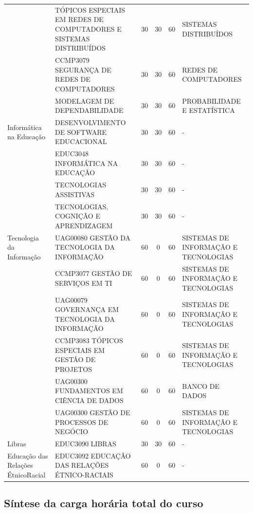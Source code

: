 \documentclass[
	12pt,				%
	openright,			%
  oneside,     %
	a4paper,			%
	chapter=TITLE,		%
	english,			%
	french,				%
	spanish,			%
	brazil				%
	]{abntex2}
\begin{document}
\begin{center}
\begin{tiny}
\begin{longtable}{p{2.5cm}p{5.5cm}cccp{3.3cm}}
      & TÓPICOS ESPECIAIS EM REDES DE COMPUTADORES E SISTEMAS DISTRIBUÍDOS & 30 & 30 & 60 & SISTEMAS DISTRIBUÍDOS \\ \cline{2-6}
      & CCMP3079 SEGURANÇA DE REDES DE COMPUTADORES & 30 & 30 & 60 & REDES DE COMPUTADORES \\ \cline{2-6}
      & MODELAGEM DE DEPENDABILIDADE  & 30 & 30 & 60 & PROBABILIDADE E ESTATÍSTICA \\ \midrule
    Informática na Educação & DESENVOLVIMENTO DE SOFTWARE EDUCACIONAL & 30 & 30 & 60 & - \\ \cline{2-6}
      & EDUC3048 INFORMÁTICA NA EDUCAÇÃO & 30 & 30 & 60 & - \\ \cline{2-6}
      & TECNOLOGIAS ASSISTIVAS & 30 & 30 & 60 & - \\ \cline{2-6}
      & TECNOLOGIAS, COGNIÇÃO E APRENDIZAGEM & 30 & 30 & 60 & - \\ \midrule
    Tecnologia da Informação & UAG00080 GESTÃO DA TECNOLOGIA DA INFORMAÇÃO & 60 & 0 & 60 & SISTEMAS DE INFORMAÇÃO E TECNOLOGIAS \\ \cline{2-6}
      & CCMP3077 GESTÃO DE SERVIÇOS EM TI & 60 & 0 & 60 & SISTEMAS DE INFORMAÇÃO E TECNOLOGIAS \\ \cline{2-6}
      & UAG00079 GOVERNANÇA EM TECNOLOGIA DA INFORMAÇÃO & 60 & 0 & 60 & SISTEMAS DE INFORMAÇÃO E TECNOLOGIAS \\ \cline{2-6}
      & CCMP3083 TÓPICOS ESPECIAIS EM GESTÃO DE PROJETOS & 60 & 0 & 60 & SISTEMAS DE INFORMAÇÃO E TECNOLOGIAS \\ \cline{2-6}
      & UAG00300 FUNDAMENTOS EM CIÊNCIA DE DADOS & 60 & 0 & 60 & BANCO DE DADOS \\ \cline{2-6}
      & UAG00300 GESTÃO DE PROCESSOS DE NEGÓCIO & 60 & 0 & 60 & SISTEMAS DE INFORMAÇÃO E TECNOLOGIAS \\ \midrule
    Libras & EDUC3090 LIBRAS & 30 & 30 & 60 & - \\ \midrule
    Educação das Relações Étnico\-Racial & EDUC3092  EDUCAÇÃO DAS RELAÇÕES ÉTNICO-RACIAIS & 60 & 0 & 60 & - \\
  \bottomrule
  \end{longtable}
  \end{tiny}      
  \end{center}
  
  \subsection{Síntese da carga horária total do curso}
  
\end{document}
